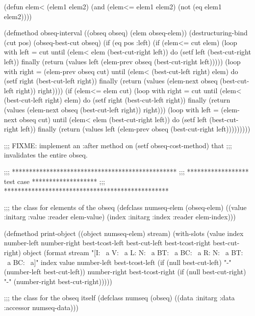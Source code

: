 (defun elem< (elem1 elem2)
  (and (elem<= elem1 elem2) (not (eq elem1 elem2))))

(defmethod obseq-interval ((obseq obseq) (elem obseq-elem))
  (destructuring-bind (cut pos) (obseq-best-cut obseq)
    (if (eq pos :left)
        (if (elem<= cut elem)
            (loop with left = cut
                  until (elem< elem (best-cut-right left))
                  do (setf left (best-cut-right left))
                  finally (return (values left (elem-prev obseq (best-cut-right left)))))
            (loop with right = (elem-prev obseq cut)
                  until (elem< (best-cut-left right) elem)
                  do (setf right (best-cut-left right))
                  finally (return (values (elem-next obseq (best-cut-left right)) right))))
        (if (elem<= elem cut)
            (loop with right = cut
                  until (elem< (best-cut-left right) elem)
                  do (setf right (best-cut-left right))
                  finally (return (values (elem-next obseq (best-cut-left right)) right)))
            (loop with left = (elem-next obseq cut)
                  until (elem< elem (best-cut-right left))
                  do (setf left (best-cut-right left))
                  finally (return (values left (elem-prev obseq (best-cut-right left)))))))))

;;; FIXME: implement an :after method on (setf obseq-cost-method) that
;;; invalidates the entire obseq. 

;;; ************************************************
;;; ****************** test case *******************
;;; ************************************************

;;; the class for elements of the obseq
(defclass numseq-elem (obseq-elem)
  ((value :initarg :value :reader elem-value)
   (index :initarg :index :reader elem-index)))

(defmethod print-object ((object numseq-elem) stream)
  (with-slots (value index number-left number-right
                     best-tcost-left best-cut-left
                     best-tcost-right best-cut-right) object
    (format stream
            "[I: ~a V: ~a {L: N: ~a BT: ~a BC: ~a} {R: N: ~a BT: ~a BC: ~a}]"
            index value
            number-left
            best-tcost-left (if (null best-cut-left) "-" (number-left best-cut-left))
            number-right
            best-tcost-right (if (null best-cut-right) "-" (number-right best-cut-right)))))

;;; the class for the obseq itself
(defclass numseq (obseq)
  ((data :initarg :data :accessor numseq-data)))

